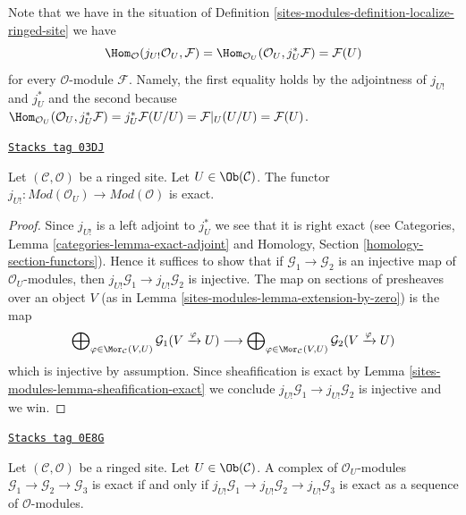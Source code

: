 Note that we have in the situation of
Definition \ref{sites-modules-definition-localize-ringed-site} we have
\begin{equation}
\label{equation-map-lower-shriek-OU-into-module}
\Hom_\mathcal{O}(j_{U!}\mathcal{O}_U, \mathcal{F}) =
\Hom_{\mathcal{O}_U}(\mathcal{O}_U, j_U^*\mathcal{F}) =
\mathcal{F}(U)
\end{equation}
for every $\mathcal{O}$-module $\mathcal{F}$. Namely, the first equality
holds by the adjointness of $j_{U!}$ and $j_U^*$ and the second because
$\Hom_{\mathcal{O}_U}(\mathcal{O}_U, j_U^*\mathcal{F}) =
j_U^*\mathcal{F}(U/U) = \mathcal{F}|_U(U/U) = \mathcal{F}(U)$.

\begin{lemma}
\label{sites-modules-lemma-extension-by-zero-exact}
\href{https://stacks.math.columbia.edu/tag/03DJ}{\texttt{Stacks tag 03DJ}}

Let $(\mathcal{C}, \mathcal{O})$ be a ringed site.
Let $U \in \Ob(\mathcal{C})$.
The functor
$j_{U!} : \textit{Mod}(\mathcal{O}_U) \to \textit{Mod}(\mathcal{O})$
is exact.
\end{lemma}

\begin{proof}
Since $j_{U!}$ is a left adjoint to $j_U^*$ we see that it is right exact
(see
Categories, Lemma \ref{categories-lemma-exact-adjoint}
and
Homology, Section \ref{homology-section-functors}).
Hence it suffices to show that if $\mathcal{G}_1 \to \mathcal{G}_2$
is an injective map of $\mathcal{O}_U$-modules, then
$j_{U!}\mathcal{G}_1 \to j_{U!}\mathcal{G}_2$ is injective.
The map on sections of presheaves over an object $V$
(as in Lemma \ref{sites-modules-lemma-extension-by-zero}) is the map
$$
\bigoplus\nolimits_{\varphi \in \Mor_\mathcal{C}(V, U)}
\mathcal{G}_1(V \xrightarrow{\varphi} U)
\longrightarrow
\bigoplus\nolimits_{\varphi \in \Mor_\mathcal{C}(V, U)}
\mathcal{G}_2(V \xrightarrow{\varphi} U)
$$
which is injective by assumption. Since sheafification is exact by
Lemma \ref{sites-modules-lemma-sheafification-exact}
we conclude $j_{U!}\mathcal{G}_1 \to j_{U!}\mathcal{G}_2$ is injective and
we win.
\end{proof}

\begin{lemma}
\label{sites-modules-lemma-j-shriek-reflects-exactness}
\href{https://stacks.math.columbia.edu/tag/0E8G}{\texttt{Stacks tag 0E8G}}

Let $(\mathcal{C}, \mathcal{O})$ be a ringed site.
Let $U \in \Ob(\mathcal{C})$. A complex of $\mathcal{O}_U$-modules
$\mathcal{G}_1 \to \mathcal{G}_2 \to \mathcal{G}_3$ is exact
if and only if
$j_{U!}\mathcal{G}_1 \to j_{U!}\mathcal{G}_2 \to j_{U!}\mathcal{G}_3$
is exact as a sequence of $\mathcal{O}$-modules.
\end{lemma}

